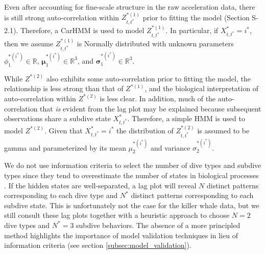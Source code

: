Even after accounting for fine-scale structure in the raw acceleration data, there is still strong auto-correlation within $Z^{*(1)}_{t,t^*}$ prior to fitting the model (Section S-2.1). Therefore, a CarHMM is used to model $Z^{*(1)}_{t,t^*}$. In particular, if $X^*_{t,t^*} = i^*$, then we assume $Z^{*(1)}_{t,t^*}$ is Normally distributed with unknown parameters $\phi_1^{*(i^*)} \in \mathbb{R}$, $\mathbf{\mu}_1^{*(i^*)} \in \mathbb{R}^3$, and $\mathbf{\sigma}_1^{*(i^*)} \in \mathbb{R}^3$.
%
%

While $Z^{*(2)}$ also exhibits some auto-correlation prior to fitting the model, the relationship is less strong than that of $Z^{*(1)}$, and the biological interpretation of auto-correlation within $Z^{*(2)}$ is less clear. In addition, much of the auto-correlation that \textit{is} evident from the lag plot may be explained because subsequent observations share a subdive state $X^*_{t,t^*}$. Therefore, a simple HMM is used to model $Z^{*(2)}$. Given that $X^*_{t,t^*} = i^*$ the distribution of $Z^{*(2)}_{t,t^*}$ is assumed to be gamma and parameterized by its mean $\mu_2^{*(i^*)}$ and variance $\sigma_2^{*(i^*)}$.
%
%

We do not use information criteria to select the number of dive types and subdive types since they tend to overestimate the number of states in biological processes \citep{Pohle:2017}. If the hidden states are well-separated, a lag plot will reveal $N$ distinct patterns corresponding to each dive type and $N^*$ distinct patterns corresponding to each subdive state. This is unfortunately not the case for the killer whale data, but we still consult these lag plots together with a heuristic approach to choose $N = 2$ dive types and $N^* = 3$ subdive behaviors. The absence of a more principled method highlights the importance of model validation techniques in lieu of information criteria (see section \ref{subsec:model_validation}). 

